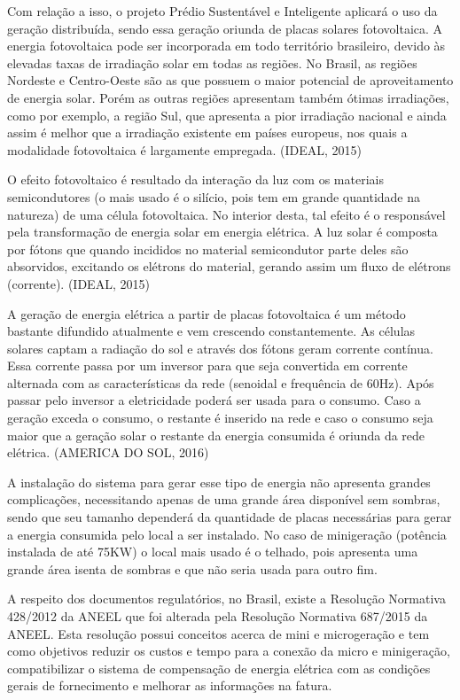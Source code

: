 Com relação a isso, o projeto Prédio Sustentável e Inteligente aplicará o uso da geração distribuída, sendo essa geração oriunda de placas solares fotovoltaica.
A energia fotovoltaica pode ser incorporada em todo território brasileiro, devido às elevadas taxas de irradiação solar em todas as regiões. No Brasil, as regiões Nordeste e Centro-Oeste são as que possuem o maior potencial de aproveitamento de energia solar. Porém as outras regiões apresentam também ótimas irradiações, como por exemplo, a região Sul, que apresenta a pior irradiação nacional e ainda assim é melhor que a irradiação existente em países europeus, nos quais a modalidade fotovoltaica é largamente empregada. (IDEAL, 2015)

O efeito fotovoltaico é resultado da interação da luz com os materiais semicondutores (o mais usado é o silício, pois tem em grande quantidade na natureza) de uma célula fotovoltaica. No interior desta, tal efeito é o responsável pela transformação de energia solar em energia elétrica. A luz solar é composta por fótons que quando incididos no material semicondutor parte deles são absorvidos, excitando os elétrons do material, gerando assim um fluxo de elétrons (corrente). (IDEAL, 2015)

A geração de energia elétrica a partir de placas fotovoltaica é um método bastante difundido atualmente e vem crescendo constantemente. As células solares captam a radiação do sol e através dos fótons geram corrente contínua. Essa corrente passa por um inversor para que seja convertida em corrente alternada com as características da rede (senoidal e frequência de 60Hz). Após passar pelo inversor a eletricidade poderá ser usada para o consumo. Caso a geração exceda o consumo, o restante é inserido na rede e caso o consumo seja maior que a geração solar o restante da energia consumida é oriunda da rede elétrica. (AMERICA DO SOL, 2016)

A instalação do sistema para gerar esse tipo de energia não apresenta grandes complicações, necessitando apenas de uma grande área disponível sem sombras, sendo que seu tamanho dependerá da quantidade de placas necessárias para gerar a energia consumida pelo local a ser instalado. No caso de minigeração (potência instalada de até 75KW) o local mais usado é o telhado, pois apresenta uma grande área isenta de sombras e que não seria usada para outro fim.

A respeito dos documentos regulatórios, no Brasil, existe a Resolução Normativa 428/2012 da ANEEL que foi alterada pela Resolução Normativa 687/2015 da ANEEL. Esta resolução possui conceitos acerca de mini e microgeração e tem como objetivos reduzir os custos e tempo para a conexão da micro e minigeração, compatibilizar o sistema de compensação de energia elétrica com as condições gerais de fornecimento e melhorar as informações na fatura.

